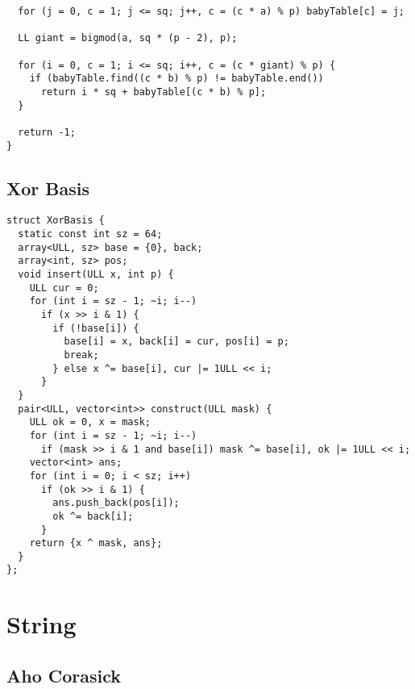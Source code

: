 \documentclass[FSZ,a4paper,onesided]{article}
\begin{document}
\begin{multicols*}{\COLS}
\begin{lstlisting}
  for (j = 0, c = 1; j <= sq; j++, c = (c * a) % p) babyTable[c] = j;

  LL giant = bigmod(a, sq * (p - 2), p);

  for (i = 0, c = 1; i <= sq; i++, c = (c * giant) % p) {
    if (babyTable.find((c * b) % p) != babyTable.end())
      return i * sq + babyTable[(c * b) % p];
  }

  return -1;
}
\end{lstlisting}
\subsection{Xor Basis}
\begin{lstlisting}
struct XorBasis {
  static const int sz = 64;
  array<ULL, sz> base = {0}, back;
  array<int, sz> pos;
  void insert(ULL x, int p) {
    ULL cur = 0;
    for (int i = sz - 1; ~i; i--)
      if (x >> i & 1) {
        if (!base[i]) {
          base[i] = x, back[i] = cur, pos[i] = p;
          break;
        } else x ^= base[i], cur |= 1ULL << i;
      }
  }
  pair<ULL, vector<int>> construct(ULL mask) {
    ULL ok = 0, x = mask;
    for (int i = sz - 1; ~i; i--)
      if (mask >> i & 1 and base[i]) mask ^= base[i], ok |= 1ULL << i;
    vector<int> ans;
    for (int i = 0; i < sz; i++)
      if (ok >> i & 1) {
        ans.push_back(pos[i]);
        ok ^= back[i];
      }
    return {x ^ mask, ans};
  }
};
\end{lstlisting}
\section{String}
\subsection{Aho Corasick}
\begin{lstlisting}


\end{lstlisting}
\end{multicols*}
\end{document}
